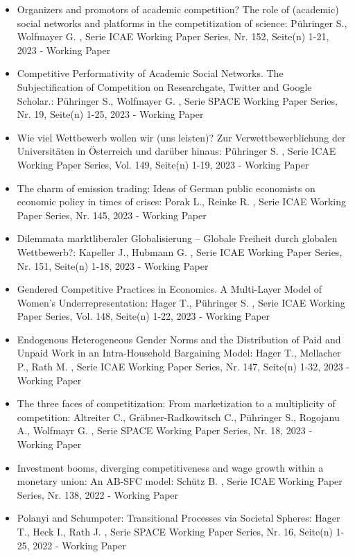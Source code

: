 \begin{itemize}
\item Organizers and promotors of academic competition? The role of (academic) social networks and platforms in the competitization of science: Pühringer S., Wolfmayer G. , Serie ICAE Working Paper Series, Nr. 152, Seite(n) 1-21, 2023 - Working Paper
\item Competitive Performativity of Academic Social Networks. The Subjectification of Competition on Researchgate, Twitter and Google Scholar.: Pühringer S., Wolfmayer G. , Serie SPACE Working Paper Series, Nr. 19, Seite(n) 1-25, 2023 - Working Paper
\item Wie viel Wettbewerb wollen wir (uns leisten)? Zur Verwettbewerblichung der Universitäten in Österreich und darüber hinaus: Pühringer S. , Serie ICAE Working Paper Series, Vol. 149, Seite(n) 1-19, 2023 - Working Paper
\item The charm of emission trading: Ideas of German public economists on economic policy in times of crises: Porak L., Reinke R. , Serie ICAE Working Paper Series, Nr. 145, 2023 - Working Paper
\item Dilemmata marktliberaler Globalisierung – Globale Freiheit durch globalen Wettbewerb?: Kapeller J., Hubmann G. , Serie ICAE Working Paper Series, Nr. 151, Seite(n) 1-18, 2023 - Working Paper
\item Gendered Competitive Practices in Economics. A Multi-Layer Model of Women’s Underrepresentation: Hager T., Pühringer S. , Serie ICAE Working Paper Series, Vol. 148, Seite(n) 1-22, 2023 - Working Paper
\item Endogenous Heterogeneous Gender Norms and the Distribution of Paid and Unpaid Work in an Intra-Household Bargaining Model: Hager T., Mellacher P., Rath M. , Serie ICAE Working Paper Series, Nr. 147, Seite(n) 1-32, 2023 - Working Paper
\item The three faces of competitization: From marketization to a multiplicity of competition: Altreiter C., Gräbner-Radkowitsch C., Pühringer S., Rogojanu A., Wolfmayr G. , Serie SPACE Working Paper Series, Nr. 18, 2023 - Working Paper
\item Investment booms, diverging competitiveness and wage growth within a monetary union: An AB-SFC model: Schütz B. , Serie ICAE Working Paper Series, Nr. 138, 2022 - Working Paper
\item Polanyi and Schumpeter: Transitional Processes via Societal Spheres: Hager T., Heck I., Rath J. , Serie SPACE Working Paper Series, Nr. 16, Seite(n) 1-25, 2022 - Working Paper

\end{itemize}
